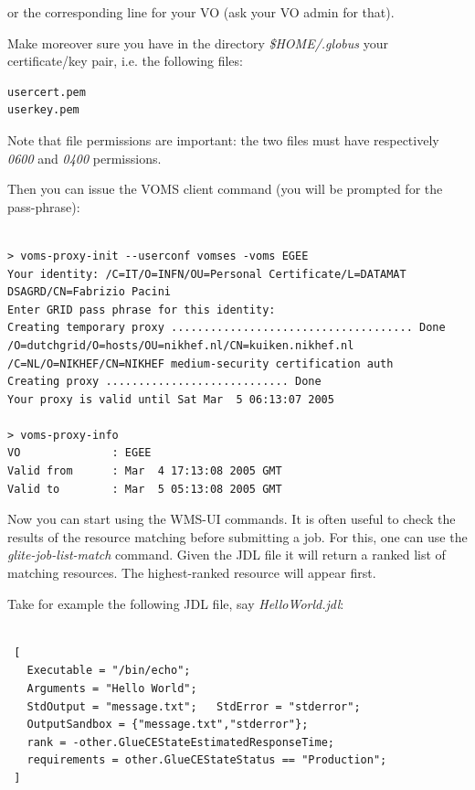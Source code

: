 or the corresponding line for your VO (ask your VO admin for that).


Make moreover sure you have in the directory \textit{\$HOME/.globus} your certificate/key pair, i.e. the following files:  

\smallskip

\begin{scriptsize}
\begin{verbatim}
usercert.pem
userkey.pem
\end{verbatim}
\end{scriptsize}
\smallskip

Note that file permissions are important: the two files must have respectively \textit{0600} and \textit{0400} permissions.  

Then you can issue the VOMS client command (you will be prompted for the pass-phrase):

\smallskip
\begin{scriptsize}
\begin{verbatim}

> voms-proxy-init --userconf vomses -voms EGEE
Your identity: /C=IT/O=INFN/OU=Personal Certificate/L=DATAMAT DSAGRD/CN=Fabrizio Pacini
Enter GRID pass phrase for this identity:
Creating temporary proxy ..................................... Done
/O=dutchgrid/O=hosts/OU=nikhef.nl/CN=kuiken.nikhef.nl
/C=NL/O=NIKHEF/CN=NIKHEF medium-security certification auth
Creating proxy ............................ Done
Your proxy is valid until Sat Mar  5 06:13:07 2005

> voms-proxy-info
VO              : EGEE
Valid from      : Mar  4 17:13:08 2005 GMT
Valid to        : Mar  5 05:13:08 2005 GMT

\end{verbatim}
\end{scriptsize}
\smallskip


Now you can start using the WMS-UI commands.
It is often useful to check the results of the resource matching before submitting a job. For this, one can use 
the \emph{glite-job-list-match} command. Given the JDL file it will return a ranked list of matching resources. 
The highest-ranked resource will appear first.

Take for example the following  JDL file, say \textit{ HelloWorld.jdl}:

\smallskip
\begin{verbatim}

 [
   Executable = "/bin/echo";
   Arguments = "Hello World";
   StdOutput = "message.txt";   StdError = "stderror";
   OutputSandbox = {"message.txt","stderror"};
   rank = -other.GlueCEStateEstimatedResponseTime;
   requirements = other.GlueCEStateStatus == "Production"; 
 ]

\end{verbatim}
\smallskip

